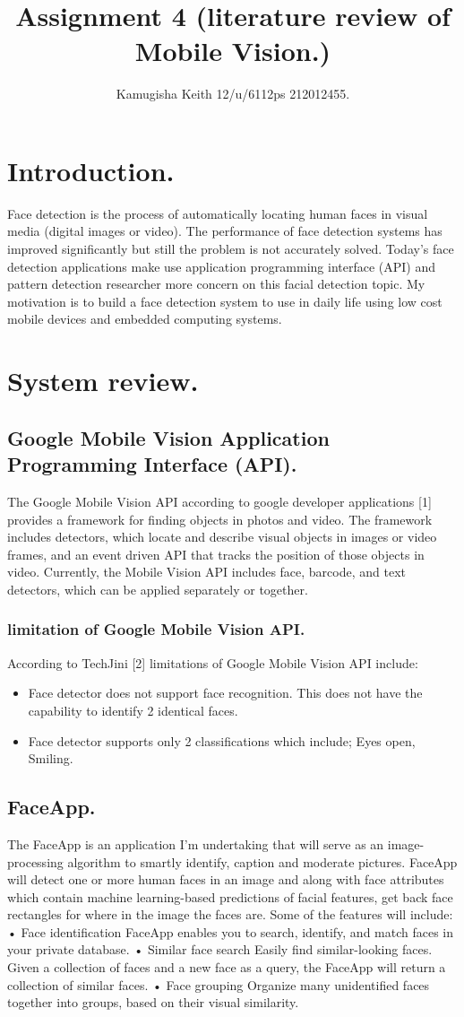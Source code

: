 \documentclass[12pt, letterpaper]{article}
\title{Assignment 4 (literature review of Mobile Vision.)}
\author{Kamugisha Keith 12/u/6112ps 212012455.}
\begin{document}
\section{Introduction.}
	Face detection is the process of automatically locating human faces in visual media (digital images or video). 
	The performance of face detection systems has improved significantly but still the problem is not accurately solved. Today’s face detection applications make use application programming interface (API) and pattern detection researcher more concern on this facial detection topic. My motivation is to build a face detection system to use in daily life using low cost mobile devices and embedded computing systems.
\section{System review.}	
\subsection{Google Mobile Vision Application Programming Interface (API).}
	The Google Mobile Vision API according to google developer applications [1] provides a framework for finding objects in photos and video. The framework includes detectors, which locate and describe visual objects in images or video frames, and an event driven API that tracks the position of those objects in video. Currently, the Mobile Vision API includes face, barcode, and text detectors, which can be applied separately or together.
\subsubsection{limitation of Google Mobile Vision API.}
	According to TechJini [2] limitations of Google Mobile Vision API include:
	\begin{itemize}
		\item Face detector does not support face recognition. This does not have the capability to identify 2 identical faces. 
		\item Face detector supports only 2 classifications which include; Eyes open, Smiling.
	\end{itemize}
\subsection{FaceApp.}
	The FaceApp is an application I’m undertaking that will serve as an image-processing algorithm to smartly identify, caption and moderate pictures. 
	FaceApp will detect one or more human faces in an image and along with face attributes which contain machine learning-based predictions of facial features, get back face rectangles for where in the image the faces are. Some of the features will include:
	•	Face identification FaceApp enables you to search, identify, and match faces in your private database.
	•	Similar face search Easily find similar-looking faces. Given a collection of faces and a new face as a query, the FaceApp will return a collection of similar faces.
	•	Face grouping Organize many unidentified faces together into groups, based on their visual similarity.
\end{document}
